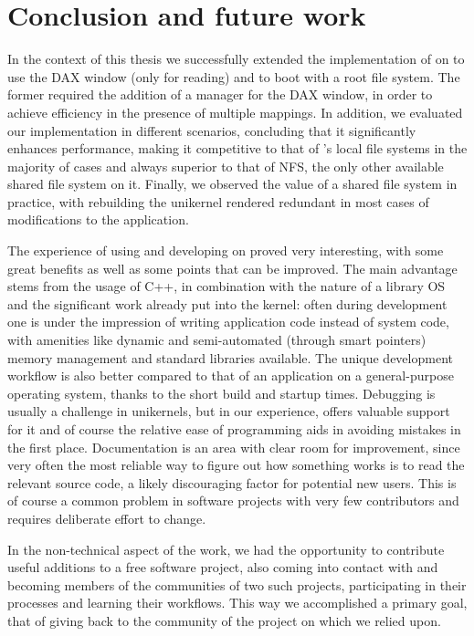 \chapter{Conclusion and future work}

In the context of this thesis we successfully extended the implementation of
\viofs{} on \osv{} to use the DAX window (only for reading) and to boot with a
\viofs{} root file system. The former required the addition of a manager for the
DAX window, in order to achieve efficiency in the presence of multiple mappings.
In addition, we evaluated our implementation in different scenarios, concluding
that it significantly enhances \viofs{} performance, making it competitive to
that of \osv{}'s local file systems in the majority of cases and always superior
to that of NFS, the only other available shared file system on it. Finally, we
observed the value of a shared file system in practice, with rebuilding the
unikernel rendered redundant in most cases of modifications to the application.

The experience of using and developing on \osv{} proved very interesting, with
some great benefits as well as some points that can be improved. The main
advantage stems from the usage of C++, in combination with the nature of a
library OS and the significant work already put into the \osv{} kernel: often
during development one is under the impression of writing application code
instead of system code, with amenities like dynamic and semi-automated (through
smart pointers) memory management and standard libraries available. The unique
development workflow is also better compared to that of an application on a
general-purpose operating system, thanks to the short build and startup times.
Debugging is usually a challenge in unikernels, but in our experience, \osv{}
offers valuable support for it \cite{osv-wiki:debugging} and of course the
relative ease of programming aids in avoiding mistakes in the first place.
Documentation is an area with clear room for improvement, since very often the
most reliable way to figure out how something works is to read the relevant
source code, a likely discouraging factor for potential new users. This is of
course a common problem in software projects with very few contributors and
requires deliberate effort to change.


In the non-technical aspect of the work, we had the opportunity to contribute
useful additions to a free software project, also coming into contact with and
becoming members of the communities of two such projects, participating in
their processes and learning their workflows. This way we accomplished a primary
goal, that of giving back to the community of the project on which we relied
upon.

